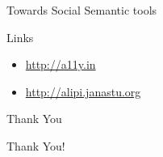 \documentclass[''urlcolor=red'']{beamer}
\begin{document}
\begin{frame}{Towards Social Semantic tools}
  \begin{block}{Links}
    \begin{itemize}
    \item \url{http://a11y.in}
    \item \url{http://alipi.janastu.org}
    \end{itemize}
  \end{block}
\end{frame}

\begin{frame}{Thank You}
  \begin{center}
    Thank You!\\
  \end{center}
\end{frame}
\end{document}
